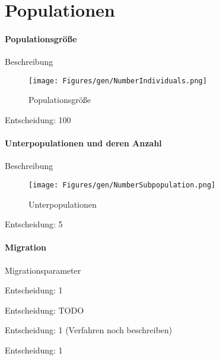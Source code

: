 \section{Populationen}\label{populations}


\paragraph{Populationsgröße}
Beschreibung





\begin{figure}[h!]
  \centering
  \texttt{[image: Figures/gen/NumberIndividuals.png]}
  \caption{Populationsgröße}\label{fig.numberindividuals}
\end{figure}

Entscheidung: 100


\paragraph{Unterpopulationen und deren Anzahl}
Beschreibung



\begin{figure}[h!]
  \centering
  \texttt{[image: Figures/gen/NumberSubpopulation.png]}
  \caption{Unterpopulationen}\label{fig.numbersubpopulation}
\end{figure}

Entscheidung: 5


\paragraph{Migration}
Migrationsparameter



Entscheidung: 1


Entscheidung: TODO


Entscheidung: 1 (Verfahren noch beschreiben)


Entscheidung: 1
